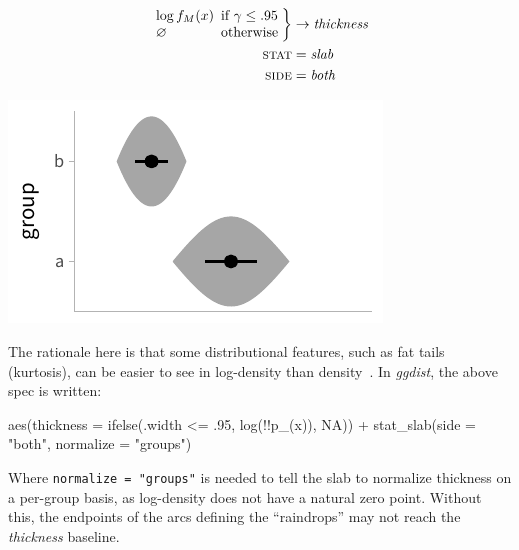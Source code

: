 \documentclass[journal]{vgtc}              %
\newenvironment{centerverbatim}{%
  \hfill\break
  \small
  \centering
  \varwidth{\linewidth}%
  \verbatim
}{%
  \endverbatim
  \endvarwidth
  \par
  \hfill\break
}
\begin{document}
 \noindent
\begin{minipage}{.5\columnwidth}

\begin{align*}
\arraycolsep=2.5pt \left.\begin{array}{ll} \log f_M(x) & \textrm{if } \gamma \le .95\\ \varnothing & \textrm{otherwise}\end{array}\right\} &\rightarrow \textit{thickness}\\
\textsc{stat} &= \mathit{slab}\\
\textsc{side} &= \mathit{both}
\end{align*}
\end{minipage}%
  \begin{minipage}{.4\columnwidth}
    \centering
    \includegraphics[width=1.2\columnwidth]{figs/3-slab_raindrop.pdf}
  \end{minipage}
\hfill\break

The rationale here is that some distributional features, such as fat tails (kurtosis), can be easier to see in log-density than density~\cite{barrowman2003raindrop}. In \textit{ggdist}, the above spec is written:

\begin{centerverbatim}
aes(thickness = ifelse(.width <= .95, log(!!p_(x)), NA)) +
stat_slab(side = "both", normalize = "groups")
\end{centerverbatim}

Where \texttt{normalize = "groups"} is needed to tell the slab to normalize thickness on a per-group basis, as log-density does not have a natural zero point. Without this, the endpoints of the arcs defining the ``raindrops'' may not reach the \textit{thickness} baseline.
\end{document}
